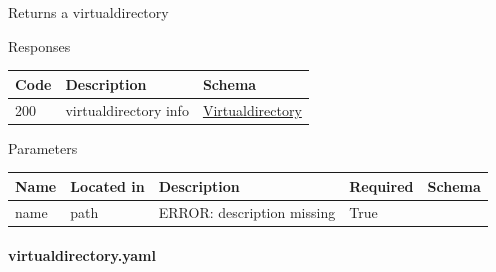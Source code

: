 \documentclass[9pt,]{article}
\let\oldparagraph\paragraph
\renewcommand{\paragraph}[1]{\oldparagraph{#1}\mbox{}}
\begin{document}
Returns a virtualdirectory

Responses

\begin{longtable}[]{@{}lll@{}}
\toprule
Code & Description & Schema\tabularnewline
\midrule
\endhead
200 & virtualdirectory info &
\protect\hyperlink{virtualdirectory}{Virtualdirectory}\tabularnewline
\bottomrule
\end{longtable}

Parameters

\begin{longtable}[]{@{}lllll@{}}
\toprule
Name & Located in & Description & Required & Schema\tabularnewline
\midrule
\endhead
name & path & ERROR: description missing & True &\tabularnewline
\bottomrule
\end{longtable}

\hypertarget{virtualdirectory.yaml}{%
\paragraph{virtualdirectory.yaml}\label{virtualdirectory.yaml}}
\end{document}
